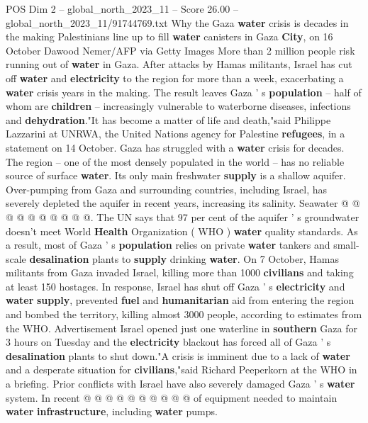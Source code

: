 \begin{textsample}{POS Dim 2 – global\_north\_2023\_11 – Score 26.00 – global\_north\_2023\_11/91744769.txt}  \label{ex:f2_pos_238}
Why the Gaza \textbf{water} crisis is decades in the making Palestinians line up to fill \textbf{water} canisters in Gaza \textbf{City}, on 16 October Dawood Nemer/AFP via Getty Images More than 2 million people risk running out of \textbf{water} in Gaza.
After attacks by Hamas militants, Israel has cut off \textbf{water} and \textbf{electricity} to the region for more than a week, exacerbating a \textbf{water} crisis years in the making.
The result leaves Gaza ' s \textbf{population} -- half of whom are \textbf{children} -- increasingly vulnerable to waterborne diseases, infections and \textbf{dehydration}."It has become a matter of life and death,"said Philippe Lazzarini at UNRWA, the United Nations agency for Palestine \textbf{refugees}, in a statement on 14 October.
Gaza has struggled with a \textbf{water} crisis for decades.
The region -- one of the most densely populated in the world -- has no reliable source of surface \textbf{water}.
Its only main freshwater \textbf{supply} is a shallow aquifer.
Over-pumping from Gaza and surrounding countries, including Israel, has severely depleted the aquifer in recent years, increasing its salinity.
Seawater @ @ @ @ @ @ @ @ @ @.
The UN says that 97 per cent of the aquifer ' s groundwater doesn't meet World \textbf{Health} Organization ( WHO ) \textbf{water} quality standards.
As a result, most of Gaza ' s \textbf{population} relies on private \textbf{water} tankers and small-scale \textbf{desalination} plants to \textbf{supply} drinking \textbf{water}.
On 7 October, Hamas militants from Gaza invaded Israel, killing more than 1000 \textbf{civilians} and taking at least 150 hostages.
In response, Israel has shut off Gaza ' s \textbf{electricity} and \textbf{water} \textbf{supply}, prevented \textbf{fuel} and \textbf{humanitarian} aid from entering the region and bombed the territory, killing almost 3000 people, according to estimates from the WHO.
Advertisement Israel opened just one waterline in \textbf{southern} Gaza for 3 hours on Tuesday and the \textbf{electricity} blackout has forced all of Gaza ' s \textbf{desalination} plants to shut down."A crisis is imminent due to a lack of \textbf{water} and a desperate situation for \textbf{civilians},"said Richard Peeperkorn at the WHO in a briefing.
Prior conflicts with Israel have also severely damaged Gaza ' s \textbf{water} system.
In recent @ @ @ @ @ @ @ @ @ @ of equipment needed to maintain \textbf{water} \textbf{infrastructure}, including \textbf{water} pumps.

\end{textsample}
